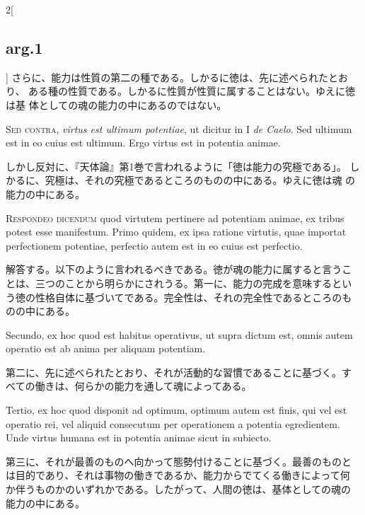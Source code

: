 \documentclass[paper=a4paper,fontsize=10pt,jafontsize=9pt,titlepage]{jlreq}
\begin{document}
\begin{paracol}{2}[\subsection{arg.1}]
さらに、能力は性質の第二の種である。しかるに徳は、先に述べられたとおり、
ある種の性質である。しかるに性質が性質に属することはない。ゆえに徳は基
体としての魂の能力の中にあるのではない。

\switchcolumn*[\subsection{s.c.}]

{\scshape Sed contra}, {\itshape virtus est ultimum potentiae}, ut
dicitur in I {\itshape de Caelo}. Sed ultimum est in eo cuius est
ultimum. Ergo virtus est in potentia animae.

\switchcolumn

しかし反対に、『天体論』第1巻で言われるように「徳は能力の究極である」。
しかるに、究極は、それの究極であるところのものの中にある。ゆえに徳は魂
の能力の中にある。


{\scshape Respondeo dicendum} quod virtutem pertinere ad potentiam
animae, ex tribus potest esse manifestum. Primo quidem, ex ipsa
ratione virtutis, quae importat perfectionem potentiae, perfectio
autem est in eo cuius est perfectio.

\switchcolumn

解答する。以下のように言われるべきである。徳が魂の能力に属すると言うこ
とは、三つのことから明らかにされうる。第一に、能力の完成を意味するとい
う徳の性格自体に基づいてである。完全性は、それの完全性であるところのも
のの中にある。

\switchcolumn*

Secundo, ex hoc quod est habitus operativus, ut supra dictum est,
omnis autem operatio est ab anima per aliquam potentiam.

\switchcolumn

第二に、先に述べられたとおり、それが活動的な習慣であることに基づく。す
べての働きは、何らかの能力を通して魂によってある。

\switchcolumn*

Tertio, ex hoc quod disponit ad optimum, optimum autem est finis, qui
vel est operatio rei, vel aliquid consecutum per operationem a
potentia egredientem. Unde virtus humana est in potentia animae sicut
in subiecto.

\switchcolumn

第三に、それが最善のものへ向かって態勢付けることに基づく。最善のものと
は目的であり、それは事物の働きであるか、能力からでてくる働きによって何
か伴うものかのいずれかである。したがって、人間の徳は、基体としての魂の
能力の中にある。


\end{paracol}
\end{document}

